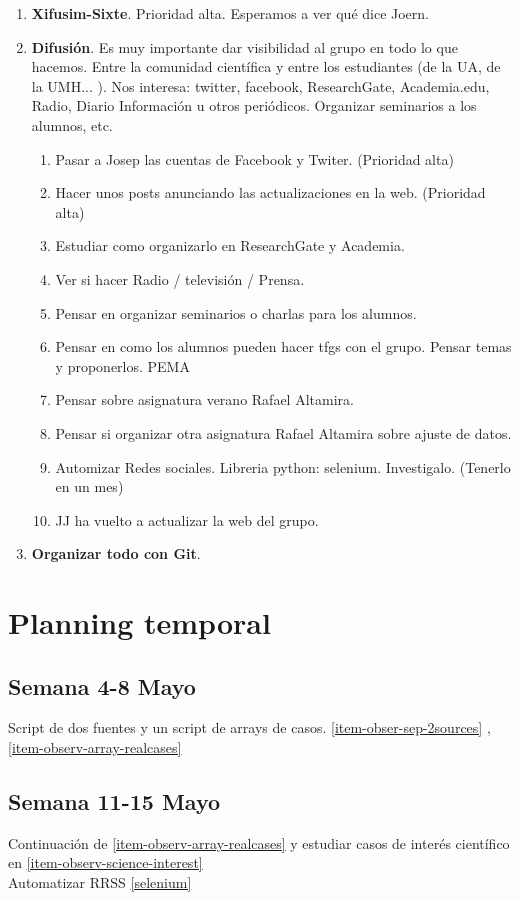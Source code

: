\documentclass[letterpaper,12pt]{article}
\newcommand{\benum}[0]{ \begin{enumerate} }
\newcommand{\eenum}[0]{ \end{enumerate} }
\begin{document}
\begin{enumerate}
\item \textbf{Xifusim-Sixte}. Prioridad alta. Esperamos a ver qu\'e dice Joern. 
\item
\label{difusion}
\textbf{Difusi\'on}. Es muy importante dar visibilidad al grupo en todo lo que hacemos. Entre la comunidad cient\'ifica y entre los estudiantes (de la UA, de la UMH... ). Nos interesa: twitter, facebook, ResearchGate, Academia.edu, Radio, Diario Informaci\'on u otros peri\'odicos. Organizar seminarios a los alumnos, etc. 
\benum
\item Pasar a Josep las cuentas de Facebook y Twiter. (Prioridad alta)
\item Hacer unos posts anunciando las actualizaciones en la web. (Prioridad alta)
\item Estudiar como organizarlo en ResearchGate y Academia. 
\item Ver si hacer Radio / televisi\'on / Prensa. 
\item Pensar en organizar seminarios o charlas para los alumnos. 
\item Pensar en como los alumnos pueden hacer tfgs con el grupo. Pensar temas y proponerlos. PEMA
\item Pensar sobre asignatura verano Rafael Altamira. 
\item Pensar si organizar otra asignatura Rafael Altamira sobre ajuste de datos. 
\item
\label{selenium}
Automizar Redes sociales. Libreria python: selenium. Investigalo. (Tenerlo en un mes)
\item JJ ha vuelto a actualizar la web del grupo. 
\eenum
\item \textbf{Organizar todo con Git}. 
\end{enumerate}
\section{Planning temporal}
\label{section-plan-temp}
\subsection*{Semana 4-8 Mayo}
Script de dos fuentes y un script de arrays de casos. \ref{item-obser-sep-2sources} , \ref{item-observ-array-realcases}
\subsection*{Semana 11-15 Mayo}
Continuación de \ref{item-observ-array-realcases} y estudiar casos de interés científico en \ref{item-observ-science-interest}
\\Automatizar RRSS \ref{selenium}
\end{document}
